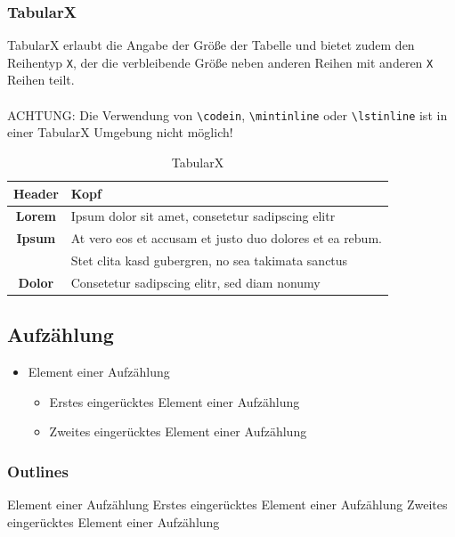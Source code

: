 \subsubsection{TabularX}
TabularX erlaubt die Angabe der Größe der Tabelle und bietet zudem den Reihentyp \texttt{X}, der die verbleibende Größe neben anderen Reihen mit anderen \texttt{X} Reihen teilt.
\\\\
ACHTUNG: Die Verwendung von \verb|\codein|, \verb|\mintinline| oder \verb|\lstinline| ist in einer TabularX Umgebung nicht möglich!
\begin{table}
    \center
    \begin{tabularx}{\textwidth}{| c | X |}
        \hline Header 	& Kopf\\ \hline\hline
        \textbf{Lorem} 	& Ipsum dolor sit amet, consetetur sadipscing elitr\\ \hline
        \textbf{Ipsum} 	& At vero eos et accusam et justo duo dolores et ea rebum.\\
            			& Stet clita kasd gubergren, no sea takimata sanctus\\ \hline
        \textbf{Dolor} 	& Consetetur sadipscing elitr, sed diam nonumy\\\hline
    \end{tabularx}
    \caption{TabularX}
    \label{tab:tabularx}
\end{table}

\newpage
\subsection{Aufzählung}
\begin{itemize}
	\item Element einer Aufzählung
	\begin{itemize}
        \item Erstes eingerücktes Element einer Aufzählung
        \item Zweites eingerücktes Element einer Aufzählung
    \end{itemize}
\end{itemize}

\subsubsection{Outlines}
\begin{outline}
    \1 Element einer Aufzählung
        \2 Erstes eingerücktes Element einer Aufzählung
        \2 Zweites eingerücktes Element einer Aufzählung
\end{outline}

